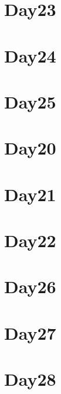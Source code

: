 
\section*{Day23}

\vfill
\section*{Day24}

\vfill
\section*{Day25}

\vfill
\section*{Day20}

\vfill
\section*{Day21}

\vfill
\section*{Day22}

\vfill
\section*{Day26}

\vfill
\section*{Day27}

\vfill
\section*{Day28}

\vfill
